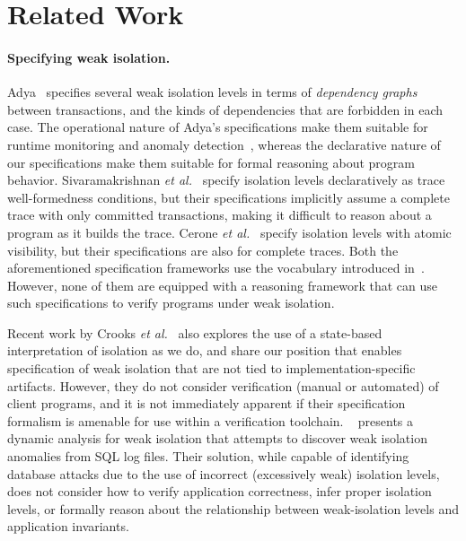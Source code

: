 \vspace*{-6pt}
\section{Related Work}
\label{sec:relatedwork}

\paragraph{Specifying weak isolation.}
Adya~\cite{adyaphd} specifies several weak isolation levels in terms
of \emph{dependency graphs} between transactions, and the kinds of
dependencies that are forbidden in each case. The operational nature
of Adya's specifications make them suitable for runtime monitoring and
anomaly detection~\cite{kemmevldb,feketesigmod08,pssi2011}, whereas
the declarative nature of our specifications make them suitable for
formal reasoning about program behavior. Sivaramakrishnan \emph{et
al.}~\cite{pldi15} specify isolation levels declaratively as trace
well-formedness conditions, but their specifications implicitly assume
a complete trace with only committed transactions, making it difficult
to reason about a program as it builds the trace. Cerone \emph{et
al.}~\cite{gotsmanconcur15} specify isolation levels with atomic
visibility, but their specifications are also for complete traces.
Both the aforementioned specification frameworks use the vocabulary
introduced in~\cite{burckhardt14}. However, none of them are equipped
with a reasoning framework that can use such specifications to verify
programs under weak isolation.

Recent work by Crooks \emph{et al.}~\cite{CPA+17} also explores the
use of a state-based interpretation of isolation as we do, and share
our position that enables specification of weak isolation that are not
tied to implementation-specific artifacts.  However, they do not
consider verification (manual or automated) of client programs, and it
is not immediately apparent if their specification formalism is
amenable for use within a verification toolchain.  ~\cite{WB17}
presents a dynamic analysis for weak isolation that attempts to
discover weak isolation anomalies from SQL log files.  Their solution,
while capable of identifying database attacks due to the use of
incorrect (excessively weak) isolation levels, does not consider how
to verify application correctness, infer proper isolation levels, or
formally reason about the relationship between weak-isolation levels
and application invariants.

